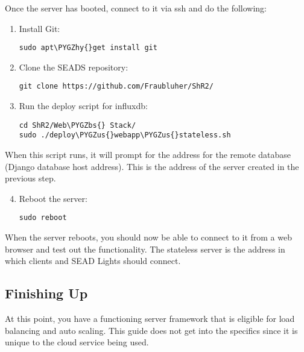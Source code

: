 \documentclass[letterpaper,10pt,english]{sphinxmanual}
\def\PYGZbs{\char`\\}
\def\PYGZus{\char`\_}
\def\PYGZhy{\char`\-}
\begin{document}
Once the server has booted, connect to it via ssh and do the following:
\begin{enumerate}
\item {} 
Install Git:

\begin{Verbatim}[commandchars=\\\{\}]
sudo apt\PYGZhy{}get install git
\end{Verbatim}

\item {} 
Clone the SEADS repository:

\begin{Verbatim}[commandchars=\\\{\}]
git clone https://github.com/Fraubluher/ShR2/
\end{Verbatim}

\item {} 
Run the deploy script for influxdb:

\begin{Verbatim}[commandchars=\\\{\}]
cd ShR2/Web\PYGZbs{} Stack/
sudo ./deploy\PYGZus{}webapp\PYGZus{}stateless.sh
\end{Verbatim}

\end{enumerate}

When this script runs, it will prompt for the address for the remote database (Django database host address). This is the address of the server created in the previous step.
\begin{enumerate}
\setcounter{enumi}{3}
\item {} 
Reboot the server:

\begin{Verbatim}[commandchars=\\\{\}]
sudo reboot
\end{Verbatim}

\end{enumerate}

When the server reboots, you should now be able to connect to it from a web browser and test out the functionality. The stateless server is the address in which clients and SEAD Lights should connect.


\subsection{Finishing Up}
\label{installation:finishing-up}
At this point, you have a functioning server framework that is eligible for load balancing and auto scaling. This guide does not get into the specifics since it is unique to the cloud service being used.
\end{document}
